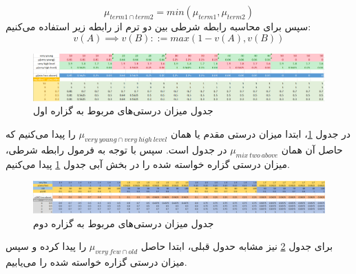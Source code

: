\documentclass[12pt]{report}
\begin{document}
	\begin{equation}
		\mu_{term1\cap term2} = min(\mu_{term1}, \mu_{term2})
	\end{equation}
	سپس برای محاسبه رابطه شرطی  بین دو ترم از رابطه زیر استفاده می‌کنیم:
	\begin{equation}
		v(A) \implies v(B) ::= max(1-v(A), v(B))
	\end{equation}
	\begin{figure}[H]
		\centering
		\includegraphics[scale=0.35]{pic_6}
		\caption{جدول میزان درستی‌های مربوط به گزاره اول}
		\label{t1}
	\end{figure}
	در جدول \ref{t1}، ابتدا میزان درستی مقدم یا همان $\mu_{very\ young\cap very\ high\ level}$ را پیدا می‌کنیم که حاصل آن همان $\mu_{mix\ two\ above}$ در جدول است. سپس با توجه به فرمول رابطه شرطی، میزان درستی گزاره خواسته شده را در بخش آبی جدول \ref{t1} پیدا می‌کنیم.
	\begin{figure}[H]
		\centering
		\includegraphics[scale=0.35]{pic_7}
		\caption{جدول میزان درستی‌های مربوط به گزاره دوم}
		\label{t2}
	\end{figure}
	برای جدول \ref{t2} نیز مشابه حدول قبلی، ابتدا حاصل $\mu_{very\ few\cap old}$ را پیدا کرده و سپس میزان درستی گزاره خواسته شده را می‌یابیم.
\end{document}

